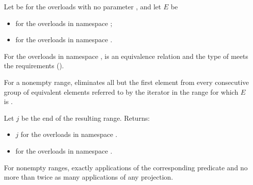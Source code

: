 \begin{itemdescr}
\pnum
Let  be 
for the overloads with no parameter , and
let $E$ be
\begin{itemize}
\setlength{\emergencystretch}{1em}
\item
  for the overloads in namespace ;
\item
  for the overloads in namespace .
\end{itemize}

\pnum
\expects
For the overloads in namespace ,
 is an equivalence relation and
the type of  meets
the  requirements ().

\pnum
\effects
For a nonempty range, eliminates all but the first element
from every consecutive group of equivalent elements referred to
by the iterator  in the range 
for which $E$ is .

\pnum
\returns
Let $j$ be the end of the resulting range. Returns:
\begin{itemize}
\item $j$ for the overloads in namespace .
\item {} for the overloads in namespace .
\end{itemize}

\pnum
\complexity
For nonempty ranges, exactly  applications
of the corresponding predicate and
no more than twice as many applications of any projection.
\end{itemdescr}

